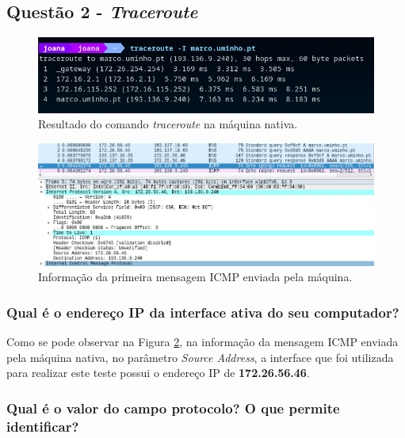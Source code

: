     

\newpage
\subsection{Questão 2 - \textit{Traceroute}}

 \begin{figure}[H]
 \centering
 \includegraphics[width=400pt]{images/ParteI/Questao2/questao2-comando.png}
 \caption{Resultado do comando \textit{traceroute} na máquina nativa.} \label{questao2-comando}
 \end{figure}
    
 \begin{figure}[H]
 \centering
 \includegraphics[width=500pt]{images/ParteI/Questao2/questao2-a)primeiroPacote.png}
 \caption{Informação da primeira mensagem ICMP enviada pela máquina.} \label{questao2-IPMaquinaNativa}
 \end{figure}
 

\subsubsection{Qual é o endereço IP da interface ativa do seu computador?}

    \par Como se pode observar na Figura \ref{questao2-IPMaquinaNativa}, na informação da mensagem ICMP enviada pela máquina nativa, no parâmetro \textit{Source Address}, a interface que foi utilizada para realizar este teste possui o endereço IP de \textbf{172.26.56.46}.


\subsubsection{Qual é o valor do campo protocolo? O que permite identificar?}


